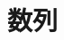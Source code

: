 \documentclass{ctexbook}
\title{数列}
\date{}
\begin{document}
\begin{titlepage}
  \maketitle
\end{titlepage}

\end{document}
